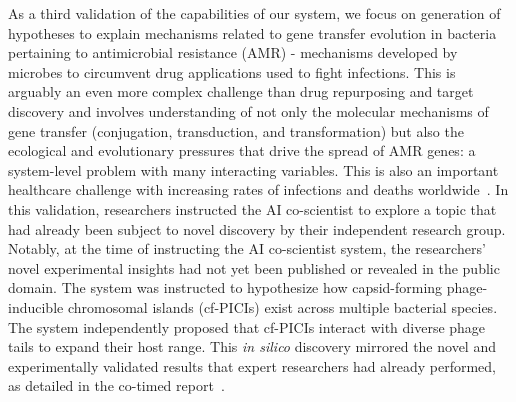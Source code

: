 As a third validation of the capabilities of our system, we focus on generation of hypotheses to explain mechanisms related to gene transfer evolution in bacteria pertaining to antimicrobial resistance (AMR) - mechanisms developed by microbes to circumvent drug applications used to fight infections. This is arguably an even more complex challenge than drug repurposing and target discovery and involves understanding of not only the molecular mechanisms of gene transfer (conjugation, transduction, and transformation) but also the ecological and evolutionary pressures that drive the spread of AMR genes: a system-level problem with many interacting variables. This is also an important healthcare challenge with increasing rates of infections and deaths worldwide~\citep{keown2014antimicrobial}. In this validation, researchers instructed the AI co-scientist to explore a topic that had already been subject to novel discovery by their independent research group. Notably, at the time of instructing the AI co-scientist system, the researchers' novel experimental insights had not yet been published or revealed in the public domain. The system was instructed to hypothesize how capsid-forming phage-inducible chromosomal islands (cf-PICIs) exist across multiple bacterial species. The system independently proposed that cf-PICIs interact with diverse phage tails to expand their host range. This \textit{in silico} discovery mirrored the novel and experimentally validated results that expert researchers had already performed, as detailed in the co-timed report~\citep{he2025chimeric, penades2025ai}.

